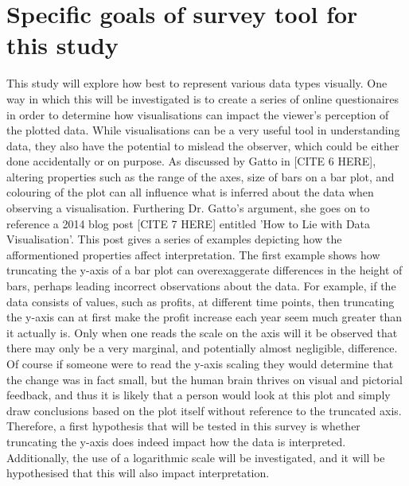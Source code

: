 \section{Specific goals of survey tool for this study}
This study will explore how best to represent various data types visually. One way in which this will be investigated is to create 
a series of online questionaires in order to determine how visualisations can impact the viewer's perception of the plotted data. 
While visualisations can be a very useful tool in understanding data, they also have the potential to mislead the observer, which 
could be either done accidentally or on purpose. As discussed by Gatto in [CITE 6 HERE], altering properties such as the range of 
the axes, size of bars on a bar plot, and colouring of the plot can all influence what is inferred about the data when observing 
a visualisation. Furthering Dr. Gatto's argument, she goes on to reference a 2014 blog post [CITE 7 HERE] entitled 'How to Lie with 
Data Visualisation'. This post gives a series of examples depicting how the afformentioned properties affect interpretation. The first 
example shows how truncating the y-axis of a bar plot can overexaggerate differences in the height of bars, perhaps leading incorrect 
observations about the data. For example, if the data consists of values, such as profits, at different time points, then truncating 
the y-axis can at first make the profit increase each year seem much greater than it actually is. Only when one reads the scale on the 
axis will it be observed that there may only be a very marginal, and potentially almost negligible, difference. Of course if someone 
were to read the y-axis scaling they would determine that the change was in fact small, but the human brain thrives on visual and 
pictorial feedback, and thus it is likely that a person would look at this plot and simply draw conclusions based on the plot itself
without reference to the truncated axis. Therefore, a first hypothesis that will be tested in this survey is whether truncating the y-axis
does indeed impact how the data is interpreted. Additionally, the use of a logarithmic scale will be investigated, and it will
be hypothesised that this will also impact interpretation.


% 

